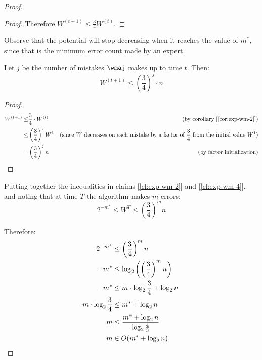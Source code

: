 \begin{proof}
\begin{proof}
        Therefore $W^{(t + 1)} \leq \frac{3}{4} W^{(t)}$.
    \end{proof}

    Observe that the potential will stop decreasing when it reaches the value of $m^*$, since that is the minimum error count made by an expert.

    \begin{claim}\label{cl:exp-wm-4}
        Let $j$ be the number of mistakes $\wmaj$ makes up to time $t$. Then:
        \[
            W^{(t + 1)} \leq \left( \frac{3}{4} \right)^j \cdot n
        \]
    \end{claim}

    \begin{proof}
        \begin{align*}
                  W^{(t + 1)}
            \leq& \frac{3}{4} \cdot W^{(t)}         & \text{(by corollary [\ref{cor:exp-wm-2}])} \\
            \leq& \left( \frac{3}{4} \right)^j W^1  & \text{(since $W$ decreases on each mistake by a factor of $\frac{3}{4}$ from the initial value $W^1$)} \\
               =& \left( \frac{3}{4} \right)^j n    & \text{(by factor initialization)}
        \end{align*}
    \end{proof}

    Putting together the inequalities in claims [\ref{cl:exp-wm-2}] and [\ref{cl:exp-wm-4}], and noting that at time $T$ the algorithm makes $m$ errors:
    \[
        2^{-m^*} \leq W^T \leq \left( \frac{3}{4} \right)^m n
    \]

    Therefore:
    \begin{align*}
        2^{-m^*} &\leq \left( \frac{3}{4} \right)^m n                   & \\
        -m^* &\leq \log_2 \left( \left( \frac{3}{4} \right)^m n \right) & \\
        -m^* &\leq m \cdot \log_2 \frac{3}{4} + \log_2 n                & \\
        -m \cdot \log_2 \frac{3}{4} &\leq m^* + \log_2 n                & \\
        m  &\leq \frac{m^* + \log_2 n}{\log_2 \frac{4}{3}}              & \\
        m  &\in O(m^* + \log_2 n)                                       & \qedhere
    \end{align*}
    
\end{proof}


